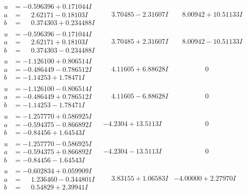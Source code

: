 \documentclass[1p]{elsarticle_modified}
\theoremstyle{definition}
\begin{document}
$$\begin{array}{c|c|c}
\begin{aligned}
u &= -0.596396 + 0.171044 I \\
a &= \phantom{-}2.62171 - 0.18103 I \\
b &= \phantom{-}0.374303 + 0.234488 I\end{aligned}
 & \phantom{-}3.70485 - 2.31607 I & \phantom{-}8.00942 + 10.51133 I \\ \hline\begin{aligned}
u &= -0.596396 - 0.171044 I \\
a &= \phantom{-}2.62171 + 0.18103 I \\
b &= \phantom{-}0.374303 - 0.234488 I\end{aligned}
 & \phantom{-}3.70485 + 2.31607 I & \phantom{-}8.00942 - 10.51133 I \\ \hline\begin{aligned}
u &= -1.126100 + 0.806514 I \\
a &= -0.486449 - 0.786512 I \\
b &= -1.14253 + 1.78471 I\end{aligned}
 & \phantom{-}4.11605 + 6.88628 I & \phantom{-0.000000 } 0 \\ \hline\begin{aligned}
u &= -1.126100 - 0.806514 I \\
a &= -0.486449 + 0.786512 I \\
b &= -1.14253 - 1.78471 I\end{aligned}
 & \phantom{-}4.11605 - 6.88628 I & \phantom{-0.000000 } 0 \\ \hline\begin{aligned}
u &= -1.257770 + 0.586925 I \\
a &= -0.594375 - 0.866892 I \\
b &= -0.84456 + 1.64543 I\end{aligned}
 & -4.2304 + 13.5113 I & \phantom{-0.000000 } 0 \\ \hline\begin{aligned}
u &= -1.257770 - 0.586925 I \\
a &= -0.594375 + 0.866892 I \\
b &= -0.84456 - 1.64543 I\end{aligned}
 & -4.2304 - 13.5113 I & \phantom{-0.000000 } 0 \\ \hline\begin{aligned}
u &= -0.602834 + 0.059909 I \\
a &= \phantom{-}1.236460 - 0.344801 I \\
b &= \phantom{-}0.54829 + 2.39941 I\end{aligned}
 & \phantom{-}3.83155 + 1.06583 I & -4.00000 + 2.27970 I \\ \hline\begin{aligned}

\end{aligned}
\end{array}$$
\end{document}
